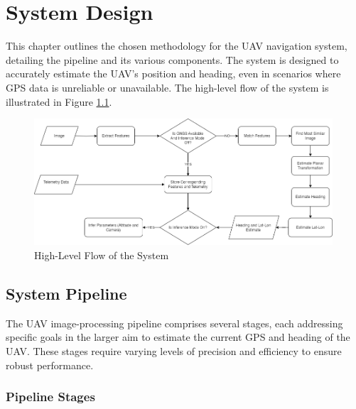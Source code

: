 

\chapter{System Design}

This chapter outlines the chosen methodology for the UAV navigation system, detailing the pipeline and its various components. The system is designed to accurately estimate the UAV's position and heading, even in scenarios where GPS data is unreliable or unavailable. The high-level flow of the system is illustrated in Figure \ref{fig:HighLevelFlow}.

\begin{figure}[H]
    \centering
    \includegraphics[width=0.99\textwidth]{Chapter 3/Chap3Figs/HighLevelFlow.png}
    \caption{High-Level Flow of the System}
    \label{fig:HighLevelFlow}
\end{figure}




\section{System Pipeline}

The UAV image-processing pipeline comprises several stages, each addressing specific goals in the larger aim to estimate the current GPS and heading of the UAV. These stages require varying levels of precision and efficiency to ensure robust performance.

\subsection{Pipeline Stages}

